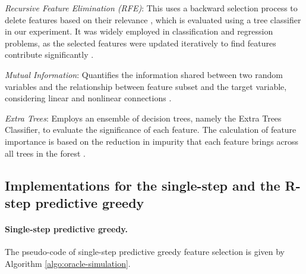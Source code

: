 \textit{Recursive Feature Elimination (RFE)}: This uses a backward selection process to delete features based on their relevance \cite{sachdeva2022systematic}, which is evaluated using a tree classifier in our experiment. It was widely employed in classification and regression problems, as the selected features were updated iteratively to find features contribute significantly \cite{abdulkareem2021evaluation,chen2018decision}.

\textit{Mutual Information}: Quantifies the information shared between two random variables and the relationship between feature subset and the target variable, considering linear and nonlinear connections \cite{vergara2014review}.

\textit{Extra Trees}: Employs an ensemble of decision trees, namely the Extra Trees Classifier, to evaluate the significance of each feature. The calculation of feature importance is based on the reduction in impurity that each feature brings across all trees in the forest \cite{sharaff2019extra}. 


\subsection{Implementations for the single-step and the R-step predictive greedy} \label{appendix:experiment1-implementations}

\paragraph{Single-step predictive greedy.} 
The pseudo-code of single-step predictive greedy feature selection is given by Algorithm \ref{algo:oracle-simulation}. 


